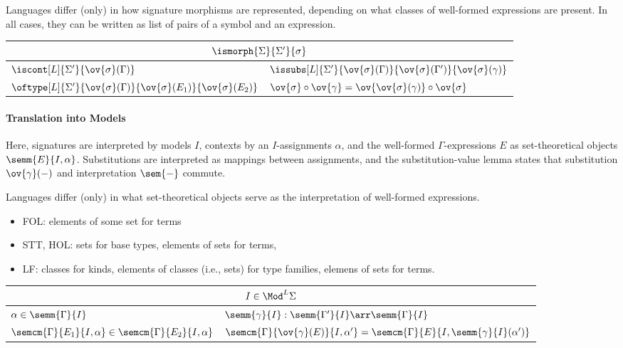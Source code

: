 Languages differ (only) in how signature morphisms are represented, depending on what classes of well-formed expressions are present. In all cases, they can be written as list of pairs of a symbol and an expression.

\begin{center}
\begin{tabular}{|l|l|}
\hline
\multicolumn{2}{|c|}{$\ismorph{\Sigma}{\Sigma'}{\sigma}$}\\[.2cm]
\hline
$\iscont[L]{\Sigma'}{\ov{\sigma}(\Gamma)}$ & $\issubs[L]{\Sigma'}{\ov{\sigma}(\Gamma)}{\ov{\sigma}(\Gamma')}{\ov{\sigma}(\gamma)}$ \\[.2cm]
\hline
$\oftype[L]{\Sigma'}{\ov{\sigma}(\Gamma)}{\ov{\sigma}(E_1)}{\ov{\sigma}(E_2)}$  &
  $\ov{\sigma}\circ\ov{\gamma} = \ov{\ov{\sigma}(\gamma)}\circ\ov{\sigma}$\\[.2cm]
\hline
\end{tabular}
\end{center}

\paragraph{Translation into Models}
Here, signatures are interpreted by models $I$, contexts by an $I$-assignments $\alpha$, and the well-formed $\Gamma$-expressions $E$ as set-theoretical objects $\semm{E}{I,\alpha}$. Substitutions are interpreted as mappings between assignments, and the substitution-value lemma states that substitution $\ov{\gamma}(-)$ and interpretation $\sem{-}$ commute.

Languages differ (only) in what set-theoretical objects serve as the interpretation of well-formed expressions.
\begin{itemize}
	\item FOL: elements of some set for terms
	\item STT, HOL: sets for base types, elements of sets for terms,
	\item LF: classes for kinds, elements of classes (i.e., sets) for type families, elemens of sets for terms.
\end{itemize}

\begin{center}
\begin{tabular}{|l|l|}
\hline
\multicolumn{2}{|c|}{$I\in\Mod^L{\Sigma}$}\\[.2cm]
\hline
$\alpha\in\semm{\Gamma}{I}$ & $\semm{\gamma}{I}:\semm{\Gamma'}{I}\arr\semm{\Gamma}{I}$ \\[.2cm]
\hline
$\semcm{\Gamma}{E_1}{I,\alpha}\in\semcm{\Gamma}{E_2}{I,\alpha}$ & $\semcm{\Gamma}{\ov{\gamma}(E)}{I,\alpha'}=\semcm{\Gamma}{E}{I,\semm{\gamma}{I}(\alpha')}$ \\[.2cm]
\hline
\end{tabular}
\end{center}


